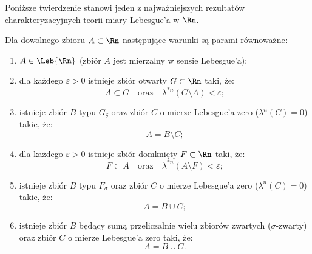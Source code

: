 Poniższe twierdzenie stanowi jeden z najważniejszych rezultatów charakteryzacyjnych teorii miary Lebesgue'a w $\Rn$.

\begin{tw}\label{tw:charakter_mierzalnosci}
    Dla dowolnego zbioru $A \subset \Rn$ następujące warunki są parami równoważne:
    \begin{enumerate}
        \item[(1)] $A \in \Leb{\Rn}$ (zbiór $A$ jest mierzalny w sensie Lebesgue'a);
        \item[(2)] dla każdego $\varepsilon > 0$ istnieje zbiór otwarty $G \subset \Rn$ taki, że:
              \begin{equation*}
                  A \subset G \quad \text{oraz} \quad \lambda^{*n}(G \setminus A) < \varepsilon;
              \end{equation*}
        \item[(3)] istnieje zbiór $B$ typu $G_\delta$ oraz zbiór $C$ o mierze Lebesgue'a zero ($\lambda^n(C) = 0$) takie, że:
              \begin{equation*}
                  A = B \setminus C;
              \end{equation*}
        \item[(4)] dla każdego $\varepsilon > 0$ istnieje zbiór domknięty $F \subset \Rn$ taki, że:
              \begin{equation*}
                  F \subset A \quad \text{oraz} \quad \lambda^{*n}(A \setminus F) < \varepsilon;
              \end{equation*}
        \item[(5)] istnieje zbiór $B$ typu $F_\sigma$ oraz zbiór $C$ o mierze Lebesgue'a zero ($\lambda^n(C) = 0$) takie, że:
              \begin{equation*}
                  A = B \cup C;
              \end{equation*}
        \item[(6)] istnieje zbiór $B$ będący sumą przeliczalnie wielu zbiorów zwartych ($\sigma$-zwarty) oraz zbiór $C$ o mierze Lebesgue'a zero taki, że:
              \begin{equation*}
                  A = B \cup C.
              \end{equation*}
    \end{enumerate}
\end{tw}

